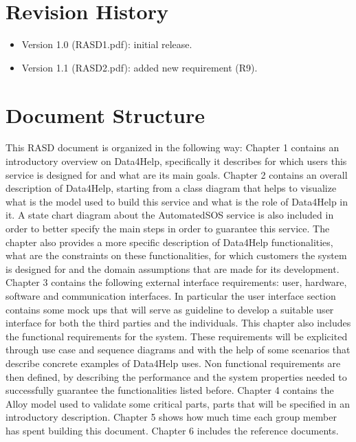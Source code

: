 \section{Revision History}

\begin{itemize}
\item Version 1.0 (RASD1.pdf): initial release.
\item Version 1.1 (RASD2.pdf): added new requirement (R9).
\end{itemize}

\section{Document Structure}
This RASD document is organized in the following way:
Chapter 1 contains an introductory overview on Data4Help, specifically it describes for which users this service is designed for and what are its main goals.
\givespace
Chapter 2 contains an overall description of Data4Help, starting from a class diagram that helps to visualize what is the model used to build this service and what is the role of Data4Help in it. A state chart diagram about the AutomatedSOS service is also included in order to better specify the main steps in order to guarantee this service. The chapter also provides a more specific description of Data4Help functionalities, what are the constraints on these functionalities, for which customers the system is designed for and the domain assumptions that are made for its development.
\givespace
Chapter 3 contains the following external interface requirements: user, hardware, software and communication interfaces. In particular the user interface section contains some mock ups that will serve as guideline to develop a suitable user interface for both the third parties and the individuals. 
This chapter also includes the functional requirements for the system. These requirements will be explicited through use case and sequence diagrams and with the help of some scenarios that describe concrete examples of Data4Help uses.
Non functional requirements are then defined, by describing the performance and the system properties needed to successfully guarantee the functionalities listed before.
\givespace
Chapter 4 contains the Alloy model used to validate some critical parts, parts that will be specified in an introductory description.
\givespace
Chapter 5 shows how much time each group member has spent building this document.
\givespace
Chapter 6 includes the reference documents.